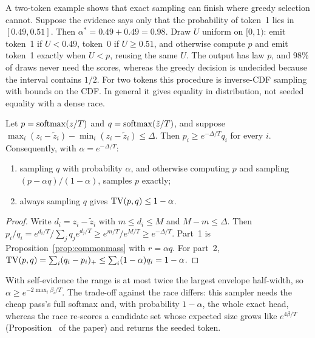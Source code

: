 A two-token example shows that exact sampling can finish where greedy selection cannot. Suppose the evidence says only that the probability of token~1 lies in $[0.49,0.51]$. Then $\alpha^\ast=0.49+0.49=0.98$. Draw $U$ uniform on $[0,1)$: emit token~1 if $U<0.49$, token~0 if $U\ge0.51$, and otherwise compute $p$ and emit token~1 exactly when $U<p$, reusing the same $U$. The output has law $p$, and 98\% of draws never need the scores, whereas the greedy decision is undecided because the interval contains $1/2$. For two tokens this procedure is inverse-CDF sampling with bounds on the CDF. In general it gives equality in distribution, not seeded equality with a dense race.

\begin{proposition}\label{prop:boundedrange}
Let $p=\operatorname{softmax}(z/T)$ and $q=\operatorname{softmax}(\tilde z/T)$, and suppose $\max_i(z_i-\tilde z_i)-\min_i(z_i-\tilde z_i)\le\Delta$. Then $p_i\ge e^{-\Delta/T}q_i$ for every $i$. Consequently, with $\alpha=e^{-\Delta/T}$:
\begin{enumerate}
\item sampling $q$ with probability $\alpha$, and otherwise computing $p$ and sampling $(p-\alpha q)/(1-\alpha)$, samples $p$ exactly;
\item always sampling $q$ gives $\operatorname{TV}(p,q)\le1-\alpha$.
\end{enumerate}
\end{proposition}
\begin{proof}
Write $d_i=z_i-\tilde z_i$ with $m\le d_i\le M$ and $M-m\le\Delta$. Then $p_i/q_i=e^{d_i/T}/\sum_jq_je^{d_j/T}\ge e^{m/T}/e^{M/T}\ge e^{-\Delta/T}$. Part~1 is Proposition~\ref{prop:commonmass} with $r=\alpha q$. For part~2, $\operatorname{TV}(p,q)=\sum_i(q_i-p_i)_+\le\sum_i(1-\alpha)q_i=1-\alpha$.
\end{proof}
With self-evidence the range is at most twice the largest envelope half-width, so $\alpha\ge e^{-2\max_i\beta_i/T}$. The trade-off against the race differs: this sampler needs the cheap pass's full softmax and, with probability $1-\alpha$, the whole exact head, whereas the race re-scores a candidate set whose expected size grows like $e^{4\beta/T}$ (Proposition~ of the paper) and returns the seeded token.

